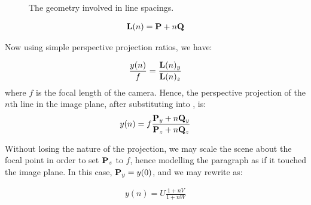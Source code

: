 \begin{figure}[t]
\centering
\begin{center}
\caption{The geometry involved in line spacings.}
\label{zyspacings}
\end{center}
\end{figure}

\begin{eqnarray}
{ \bf L }(n) = { \bf P }+n{ \bf Q } \label{nthline}
\end{eqnarray}

{\parindent 0mm
Now using simple perspective projection ratios, we have: 
}

\begin{eqnarray}
\frac{y(n)}{f}  = \frac{ { \bf L }(n)_y }{ { \bf L }(n)_z }  \label{spacingspq1}
\end{eqnarray}
{\parindent 0mm
where $f$ is the focal length of the camera. Hence, the perspective projection
of the  $n$th line in the image plane, after substituting  into
, is: 
}
\begin{eqnarray}
y(n) =  f \frac{ { \bf P }_y + n { \bf Q }_y }{ { \bf P }_z + n{ \bf Q }_z } \label{spacingspq}
\end{eqnarray}

{\parindent 0mm
Without losing the nature of the projection, we may scale the scene about the focal point in order to set ${ \bf P }_z$ to $f$, hence modelling the paragraph as if it touched the image plane.  In this case, ${ \bf P }_y=y(0)$,
and we may rewrite  as:
}

\begin{eqnarray}
y(n) = U \frac{ 1 + nV }{ 1 + nW } \label{spacingsvweqn}
\end{eqnarray}

